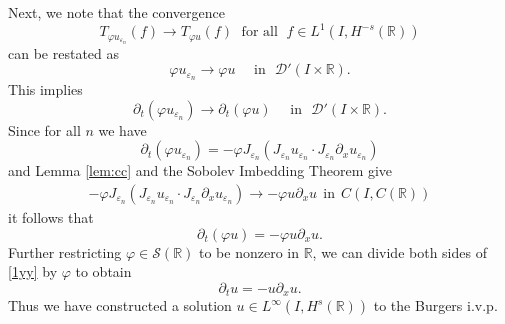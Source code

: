 \documentclass[12pt,reqno]{amsart}
\newcommand{\rr}{\mathbb{R}}
\newcommand{\p}{\partial}
\newcommand{\ee}{\varepsilon}
\newcommand{\vp}{\varphi}
\theoremstyle{plain}  %
\theoremstyle{definition}
\begin{document}
\vskip0.1in
		Next, we note that the convergence  
		\begin{equation}
			\label{weak-conv-2}
			T_{\vp u_{\ee_n}}(f)  \longrightarrow  T_{\vp u} (f) \;
			\text{ for all } \;  f \in L^1(I, H^{-s}(\rr))
		\end{equation}
		can be restated as 
		\begin{equation}
			\vp u_{\ee_n}  \longrightarrow  \vp u
			\quad
			\text{ in }  \,\,
			\mathcal{D}'(I\times \rr).
		\end{equation}
		This implies 
		\begin{equation}
			\label{distib-conv-2}
			\p_t(\vp u_{\ee_n})  \longrightarrow  \p_t (\vp u)
			\quad
			\text{ in }  \,\, \mathcal{D}'(I\times \rr).
		\end{equation}
		Since for all $n$ we have 
		\begin{equation}
			\p_t (\vp u_{\ee_n}) 
			=
			-\vp
			J_{\varepsilon_n} (J_{\varepsilon_n} u_{\varepsilon_n}  \cdot
			J_{\varepsilon_n}\partial_x u_{\varepsilon_n}) 
		\end{equation}
		and Lemma \ref{lem:cc} and the Sobolev Imbedding Theorem give
		\begin{equation}
			\begin{split}
				-\vp
			J_{\varepsilon_n} (J_{\varepsilon_n} u_{\varepsilon_n}  \cdot
			J_{\varepsilon_n}\partial_x u_{\varepsilon_n}) \to - \vp u \p_x
			u \ \ \text{in} \ \ C(I, C(\rr))
				\label{adone}
			\end{split}
		\end{equation}
		it follows that
		\begin{equation}
			\label{1yy}
			\partial_t (\vp u) =-\vp u \partial_x u.
		\end{equation}
		Further restricting $\vp \in \mathcal{S}(\rr)$ to be nonzero in
		$\rr$, we
		can divide both sides of \eqref{1yy} by $\vp$ to obtain
		\begin{equation}
			\label{2yy}
			\partial_t u = -u \partial_x u.
		\end{equation}
		Thus we have constructed a solution $u \in L^\infty(I, H^s(\rr))$
		to the Burgers i.v.p. 
		\vskip0.1in

\end{document}
